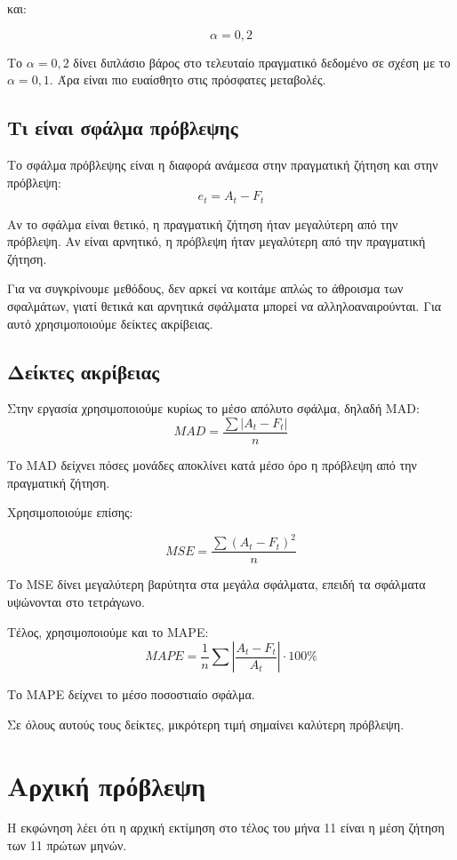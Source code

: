 \documentclass[12pt,a4paper]{article}
\begin{document}
και:

\[
\alpha=0{,}2
\]

Το \(\alpha=0{,}2\) δίνει διπλάσιο βάρος στο τελευταίο πραγματικό δεδομένο σε σχέση με το \(\alpha=0{,}1\). Άρα είναι πιο ευαίσθητο στις πρόσφατες μεταβολές.

\subsection{Τι είναι σφάλμα πρόβλεψης}

Το σφάλμα πρόβλεψης είναι η διαφορά ανάμεσα στην πραγματική ζήτηση και στην πρόβλεψη:
\[
e_t=A_t-F_t
\]

Αν το σφάλμα είναι θετικό, η πραγματική ζήτηση ήταν μεγαλύτερη από την πρόβλεψη. Αν είναι αρνητικό, η πρόβλεψη ήταν μεγαλύτερη από την πραγματική ζήτηση.

Για να συγκρίνουμε μεθόδους, δεν αρκεί να κοιτάμε απλώς το άθροισμα των σφαλμάτων, γιατί θετικά και αρνητικά σφάλματα μπορεί να αλληλοαναιρούνται. Για αυτό χρησιμοποιούμε δείκτες ακρίβειας.

\subsection{Δείκτες ακρίβειας}

Στην εργασία χρησιμοποιούμε κυρίως το μέσο απόλυτο σφάλμα, δηλαδή MAD:
\[
MAD=\frac{\sum |A_t-F_t|}{n}
\]

Το MAD δείχνει πόσες μονάδες αποκλίνει κατά μέσο όρο η πρόβλεψη από την πραγματική ζήτηση.

Χρησιμοποιούμε επίσης:

\[
MSE=\frac{\sum (A_t-F_t)^2}{n}
\]

Το MSE δίνει μεγαλύτερη βαρύτητα στα μεγάλα σφάλματα, επειδή τα σφάλματα υψώνονται στο τετράγωνο.

Τέλος, χρησιμοποιούμε και το MAPE:
\[
MAPE=\frac{1}{n}\sum \left|\frac{A_t-F_t}{A_t}\right|\cdot100\%
\]

Το MAPE δείχνει το μέσο ποσοστιαίο σφάλμα.

Σε όλους αυτούς τους δείκτες, μικρότερη τιμή σημαίνει καλύτερη πρόβλεψη.

\section{Αρχική πρόβλεψη}

Η εκφώνηση λέει ότι η αρχική εκτίμηση στο τέλος του μήνα 11 είναι η μέση ζήτηση των 11 πρώτων μηνών.
\end{document}

